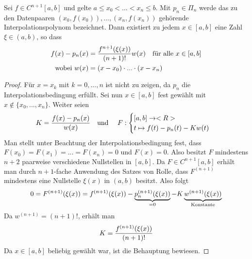 \begin{proposition}
	Sei $f\in C^{n+1}[a,b]$ und gelte $a\le x_0<...<x_n\le b$. Mit $p_n\in\Pi_n$ werde das zu den Datenpaaren $(x_0,f(x_0)),...,(x_n,f(x_n))$ gehörende Interpolationspolynom bezeichnet. Dann existiert zu jedem $x\in[a,b]$ eine Zahl $\xi\in(a,b)$, so dass
	\begin{align}
		f(x)-p_n(x) &= \frac{f^{n+1}(\xi(x))}{(n+1)!}w(x) \quad\text{für alle }x\in[a,b] \notag \\
		\text{wobei } w(x) &= (x-x_0)\cdot ...\cdot (x-x_n)\notag
	\end{align}
\end{proposition}
\begin{proof}
	Für $x=x_k$ mit $k=0,...,n$ ist nicht zu zeigen, da $p_n$ die Interpolationsbedingung erfüllt. Sei nun $x\in[a,b]$ fest gewählt mit $x\notin\{x_0,...,x_n\}$. Weiter seien
	\begin{align}
		K=\frac{f(x)-p_n(x)}{w(x)} \quad\text{und }\quad F:\begin{cases}
		[a,b]\to <R> \\ t\mapsto f(t)-p_n(t)-Kw(t)
		\end{cases}\notag
	\end{align} 
	Man stellt unter Beachtung der Interpolationsbedingung fest, dass $F(x_0)=F(x_1)=...=F(x_n)=0$ und $F(x)=0$. Also besitzt $F$ mindestens $n+2$ paarweise verschiedene Nullstellen in $[a,b]$. Da $F\in C^{n+1}[a,b]$ erhält man durch $n+1$-fache Anwendung des Satzes von Rolle, dass $F^{(n+1)}$ mindestens eine Nullstelle $\xi(x)$ in $(a,b)$ besitzt. Also folgt 
	\begin{align}
		0=F^{(n+1)}(\xi(x))=f^{(n+1)}(\xi(x))-\underbrace{p_n^{(n+1)}(\xi(x))}_{=0} - K\underbrace{w^{(n+1)}(\xi(x))}_{\text{Konstante}}\notag
	\end{align}
	Da $w^{(n+1)}=(n+1)!$, erhält man
	\begin{align}
		K=\frac{f^{(n+1)}(\xi(x))}{(n+1)!}\notag
	\end{align}
	Da $x\in[a,b]$ beliebig gewählt war, ist die Behauptung bewiesen.
\end{proof}

